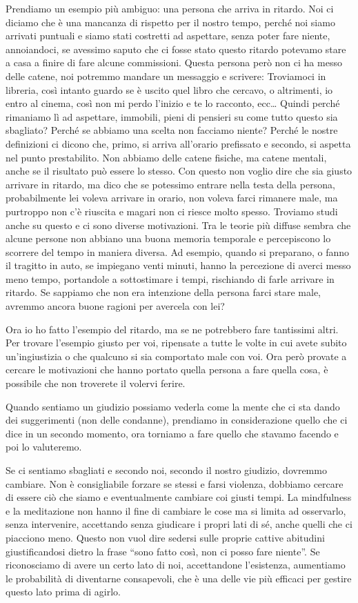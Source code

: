 \documentclass[12pt]{book} %
\begin{document}
Prendiamo un esempio più ambiguo:
una persona che arriva in ritardo. Noi ci diciamo che è una mancanza di rispetto per
il nostro tempo, perché noi siamo arrivati puntuali e siamo stati costretti ad aspettare, senza poter fare niente,
annoiandoci, se avessimo saputo che ci fosse stato questo ritardo potevamo stare a casa a finire di fare alcune commissioni.
Questa persona però non ci ha messo delle catene, noi potremmo mandare un messaggio e
scrivere: Troviamoci in libreria, così intanto guardo se è uscito quel libro che cercavo, o altrimenti, io entro al
cinema, così non mi perdo l'inizio e te lo racconto, ecc… Quindi perché rimaniamo lì ad aspettare,
immobili, pieni di pensieri su come tutto questo sia sbagliato? Perché se abbiamo una scelta non facciamo niente?
Perché le nostre definizioni ci dicono che, primo, si arriva all'orario prefissato e secondo, si
aspetta nel punto prestabilito. Non abbiamo delle catene fisiche, ma catene mentali, anche se il risultato può essere lo
stesso. Con questo non voglio dire che sia giusto arrivare in ritardo, ma dico che se potessimo entrare nella testa
della persona, probabilmente lei voleva arrivare in orario, non voleva farci rimanere
male, ma purtroppo non c'è riuscita e magari non ci riesce molto spesso. Troviamo studi anche su questo e ci sono diverse motivazioni. Tra le teorie più diffuse sembra che alcune persone non abbiano una
buona memoria temporale e percepiscono lo scorrere del tempo in maniera diversa. Ad esempio, quando si
preparano, o fanno il tragitto in auto, se impiegano venti minuti, hanno la percezione di averci messo meno tempo, portandole a sottostimare i tempi, rischiando di farle arrivare in ritardo. Se sappiamo che
non era intenzione della persona farci stare male, avremmo ancora buone ragioni per avercela con lei?

Ora io ho fatto l'esempio del ritardo, ma se ne potrebbero fare tantissimi altri. Per trovare
l'esempio giusto per voi, ripensate a tutte le volte in cui avete subito un'ingiustizia o
che qualcuno si sia comportato male con voi. Ora però provate a
cercare le motivazioni che hanno portato quella persona a fare quella cosa, è possibile che non troverete il volervi
ferire.

Quando sentiamo un giudizio possiamo vederla come la mente che ci sta
dando dei suggerimenti (non delle condanne), prendiamo in considerazione quello che ci dice in un secondo momento, ora torniamo a fare quello che stavamo facendo e poi lo valuteremo.

Se ci sentiamo
sbagliati e secondo noi, secondo il nostro giudizio, dovremmo cambiare. Non è consigliabile forzare se stessi e farsi
violenza, dobbiamo cercare di essere ciò che siamo e eventualmente cambiare coi giusti tempi. La mindfulness e la
meditazione non hanno il fine di cambiare le cose ma si limita ad osservarlo, senza intervenire, accettando senza giudicare i
propri lati di sé, anche quelli che ci piacciono meno. Questo non vuol dire sedersi sulle proprie cattive abitudini
giustificandosi dietro la frase “sono fatto così, non ci posso fare niente”. Se riconosciamo di avere un certo lato
di noi, accettandone l'esistenza, aumentiamo le probabilità di diventarne consapevoli, che è una delle vie più efficaci per gestire questo lato prima di agirlo.
\end{document}
